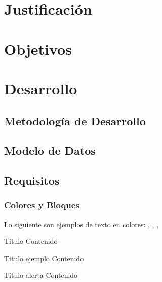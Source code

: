 \documentclass[aspectratio=169]{beamer}%
\begin{document}
\section{Justificación}
\section{Objetivos}
\section{Desarrollo}
\subsection{Metodología de Desarrollo}
\subsection{Modelo de Datos}
\subsection{Requisitos}
\begin{frame}[fragile]
	\frametitle{Colores y Bloques}
	\justifying
	Lo siguiente son ejemplos de texto en colores: , , , 

	\begin{block}{Titulo}\justifying
		Contenido
	\end{block}


	\begin{exampleblock}{Titulo ejemplo}\justifying
		Contenido
	\end{exampleblock}


	\begin{alertblock}{Titulo alerta}\justifying
		Contenido
	\end{alertblock}

	\begin{sintaxis}\justifying
	\end{sintaxis}

	\begin{resultado}\justifying
	\end{resultado}

\end{frame}
\end{document}
